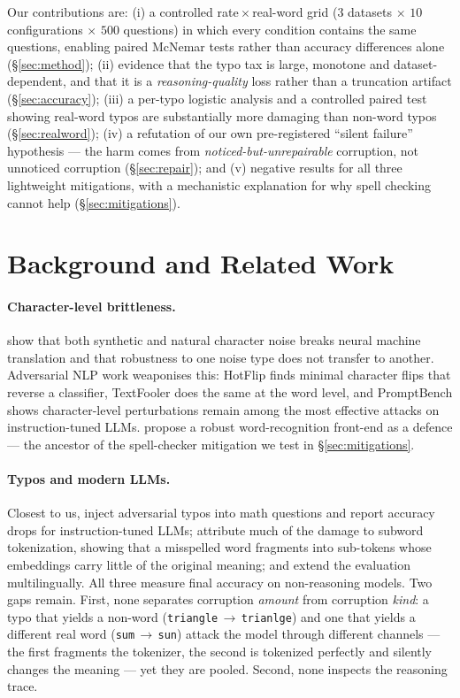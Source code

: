 \documentclass[11pt]{article}
\begin{document}
Our contributions are: (i) a controlled rate\,$\times$\,real-word grid ($3$
datasets $\times$ $10$ configurations $\times$ $500$ questions) in which every
condition contains the same questions, enabling paired McNemar tests rather than
accuracy differences alone (\S\ref{sec:method}); (ii) evidence that the typo tax
is large, monotone and dataset-dependent, and that it is a
\emph{reasoning-quality} loss rather than a truncation artifact
(\S\ref{sec:accuracy}); (iii) a per-typo logistic analysis and a controlled
paired test showing real-word typos are substantially more damaging than
non-word typos (\S\ref{sec:realword}); (iv) a refutation of our own
pre-registered ``silent failure'' hypothesis --- the harm comes from
\emph{noticed-but-unrepairable} corruption, not unnoticed corruption
(\S\ref{sec:repair}); and (v) negative results for all three lightweight
mitigations, with a mechanistic explanation for why spell checking cannot help
(\S\ref{sec:mitigations}).

\section{Background and Related Work}
\label{sec:related}

\paragraph{Character-level brittleness.}
\citet{belinkov2018} show that both synthetic and natural character noise breaks
neural machine translation and that robustness to one noise type does not
transfer to another. Adversarial NLP work weaponises this: HotFlip
\citep{ebrahimi2018} finds minimal character flips that reverse a classifier,
TextFooler \citep{jin2020} does the same at the word level, and PromptBench
\citep{zhu2024} shows character-level perturbations remain among the most
effective attacks on instruction-tuned LLMs. \citet{pruthi2019} propose a robust
word-recognition front-end as a defence --- the ancestor of the spell-checker
mitigation we test in \S\ref{sec:mitigations}.

\paragraph{Typos and modern LLMs.}
Closest to us, \citet{gan2024} inject adversarial typos into math questions and
report accuracy drops for instruction-tuned LLMs; \citet{chai2024} attribute
much of the damage to subword tokenization, showing that a misspelled word
fragments into sub-tokens whose embeddings carry little of the original meaning;
and \citet{zhao2025} extend the evaluation multilingually. All three measure
final accuracy on non-reasoning models. Two gaps remain. First, none separates
corruption \emph{amount} from corruption \emph{kind}: a typo that yields a
non-word (\texttt{triangle}\,$\to$\,\texttt{trianlge}) and one that yields a
different real word (\texttt{sum}\,$\to$\,\texttt{sun}) attack the model through
different channels --- the first fragments the tokenizer, the second is
tokenized perfectly and silently changes the meaning --- yet they are pooled.
Second, none inspects the reasoning trace.
\end{document}
